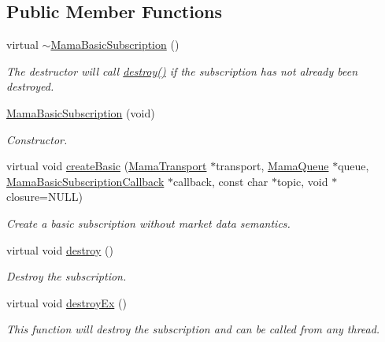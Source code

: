 \subsection*{Public Member Functions}
\begin{DoxyCompactItemize}
\item 
virtual \hyperlink{classWombat_1_1MamaBasicSubscription_a24ad7f3b3dac4e61a0f31b0db364a5e9}{$\sim$MamaBasicSubscription} ()
\begin{DoxyCompactList}\small\item\em The destructor will call {\ttfamily \hyperlink{classWombat_1_1MamaBasicSubscription_a296c25c10faa885e408e064a626ce3dd}{destroy()}} if the subscription has not already been destroyed. \item\end{DoxyCompactList}\item 
\hyperlink{classWombat_1_1MamaBasicSubscription_a337b175ab4011344f8cf47bccdc7916d}{MamaBasicSubscription} (void)
\begin{DoxyCompactList}\small\item\em Constructor. \item\end{DoxyCompactList}\item 
virtual void \hyperlink{classWombat_1_1MamaBasicSubscription_a1313d7a4e6ca044f2b1a71ebad9ff382}{createBasic} (\hyperlink{classWombat_1_1MamaTransport}{MamaTransport} $\ast$transport, \hyperlink{classWombat_1_1MamaQueue}{MamaQueue} $\ast$queue, \hyperlink{classWombat_1_1MamaBasicSubscriptionCallback}{MamaBasicSubscriptionCallback} $\ast$callback, const char $\ast$topic, void $\ast$closure=NULL)
\begin{DoxyCompactList}\small\item\em Create a basic subscription without market data semantics. \item\end{DoxyCompactList}\item 
virtual void \hyperlink{classWombat_1_1MamaBasicSubscription_a296c25c10faa885e408e064a626ce3dd}{destroy} ()
\begin{DoxyCompactList}\small\item\em Destroy the subscription. \item\end{DoxyCompactList}\item 
virtual void \hyperlink{classWombat_1_1MamaBasicSubscription_aa00ed63c4f538d8abb21255abace5ffb}{destroyEx} ()
\begin{DoxyCompactList}\small\item\em This function will destroy the subscription and can be called from any thread. \item\end{DoxyCompactList}\item 

\end{DoxyCompactItemize}
